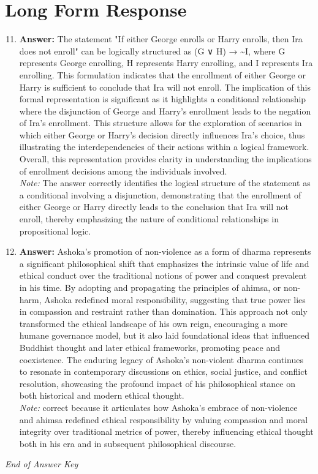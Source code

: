 \documentclass[12pt]{article}
\begin{document}
\section*{Long Form Response}
\begin{enumerate}[label=\arabic*.]
\setcounter{enumi}{10}
\item \textbf{Answer:} The statement "If either George enrolls or Harry enrolls, then Ira does not enroll" can be logically structured as (G ∨ H) → \textasciitilde{}I, where G represents George enrolling, H represents Harry enrolling, and I represents Ira enrolling. This formulation indicates that the enrollment of either George or Harry is sufficient to conclude that Ira will not enroll. The implication of this formal representation is significant as it highlights a conditional relationship where the disjunction of George and Harry's enrollment leads to the negation of Ira's enrollment. This structure allows for the exploration of scenarios in which either George or Harry's decision directly influences Ira's choice, thus illustrating the interdependencies of their actions within a logical framework. Overall, this representation provides clarity in understanding the implications of enrollment decisions among the individuals involved.
\\ \textit{Note:} The answer correctly identifies the logical structure of the statement as a conditional involving a disjunction, demonstrating that the enrollment of either George or Harry directly leads to the conclusion that Ira will not enroll, thereby emphasizing the nature of conditional relationships in propositional logic.
\item \textbf{Answer:} Ashoka's promotion of non-violence as a form of dharma represents a significant philosophical shift that emphasizes the intrinsic value of life and ethical conduct over the traditional notions of power and conquest prevalent in his time. By adopting and propagating the principles of ahimsa, or non-harm, Ashoka redefined moral responsibility, suggesting that true power lies in compassion and restraint rather than domination. This approach not only transformed the ethical landscape of his own reign, encouraging a more humane governance model, but it also laid foundational ideas that influenced Buddhist thought and later ethical frameworks, promoting peace and coexistence. The enduring legacy of Ashoka's non-violent dharma continues to resonate in contemporary discussions on ethics, social justice, and conflict resolution, showcasing the profound impact of his philosophical stance on both historical and modern ethical thought.
\\ \textit{Note:} correct because it articulates how Ashoka's embrace of non-violence and ahimsa redefined ethical responsibility by valuing compassion and moral integrity over traditional metrics of power, thereby influencing ethical thought both in his era and in subsequent philosophical discourse.
\end{enumerate}

\vfill
\noindent\textit{End of Answer Key}
\end{document}
